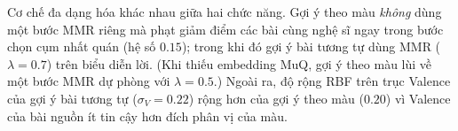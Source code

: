 \documentclass[../DoAn.tex]{subfiles}
\begin{document}
Cơ chế đa dạng hóa khác nhau giữa hai chức năng. Gợi ý theo màu \textit{không} dùng một bước MMR riêng mà phạt giảm điểm các bài cùng nghệ sĩ ngay trong bước chọn cụm nhất quán (hệ số $0.15$); trong khi đó gợi ý bài tương tự dùng MMR ($\lambda = 0.7$) trên biểu diễn lời. (Khi thiếu embedding MuQ, gợi ý theo màu lùi về một bước MMR dự phòng với $\lambda = 0.5$.) Ngoài ra, độ rộng RBF trên trục Valence của gợi ý bài tương tự ($\sigma_V = 0.22$) rộng hơn của gợi ý theo màu ($0.20$) vì Valence của bài nguồn ít tin cậy hơn đích phân vị của màu.
\end{document}
